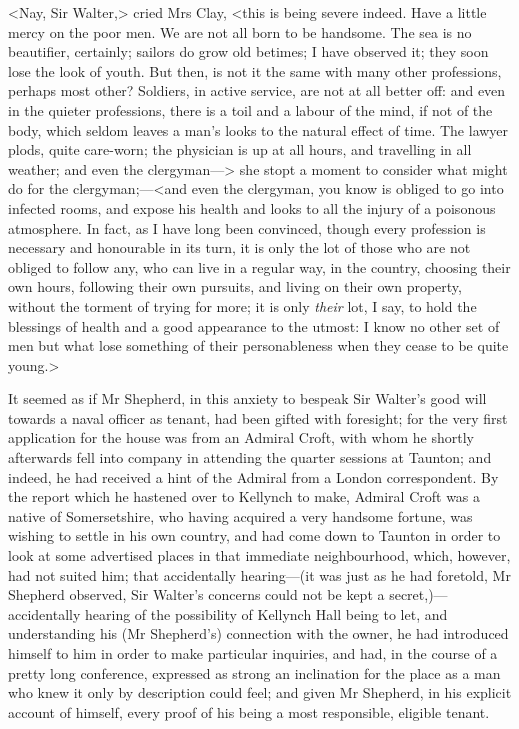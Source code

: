 <Nay, Sir Walter,> cried Mrs Clay, <this is being severe indeed. Have a little mercy on the poor men. We are not all born to be handsome. The sea is no beautifier, certainly; sailors do grow old betimes; I have observed it; they soon lose the look of youth. But then, is not it the same with many other professions, perhaps most other? Soldiers, in active service, are not at all better off: and even in the quieter professions, there is a toil and a labour of the mind, if not of the body, which seldom leaves a man's looks to the natural effect of time. The lawyer plods, quite care-worn; the physician is up at all hours, and travelling in all weather; and even the clergyman—> she stopt a moment to consider what might do for the clergyman;—<and even the clergyman, you know is obliged to go into infected rooms, and expose his health and looks to all the injury of a poisonous atmosphere. In fact, as I have long been convinced, though every profession is necessary and honourable in its turn, it is only the lot of those who are not obliged to follow any, who can live in a regular way, in the country, choosing their own hours, following their own pursuits, and living on their own property, without the torment of trying for more; it is only \textit{their} lot, I say, to hold the blessings of health and a good appearance to the utmost: I know no other set of men but what lose something of their personableness when they cease to be quite young.>

It seemed as if Mr Shepherd, in this anxiety to bespeak Sir Walter's good will towards a naval officer as tenant, had been gifted with foresight; for the very first application for the house was from an Admiral Croft, with whom he shortly afterwards fell into company in attending the quarter sessions at Taunton; and indeed, he had received a hint of the Admiral from a London correspondent. By the report which he hastened over to Kellynch to make, Admiral Croft was a native of Somersetshire, who having acquired a very handsome fortune, was wishing to settle in his own country, and had come down to Taunton in order to look at some advertised places in that immediate neighbourhood, which, however, had not suited him; that accidentally hearing—(it was just as he had foretold, Mr Shepherd observed, Sir Walter's concerns could not be kept a secret,)—accidentally hearing of the possibility of Kellynch Hall being to let, and understanding his (Mr Shepherd's) connection with the owner, he had introduced himself to him in order to make particular inquiries, and had, in the course of a pretty long conference, expressed as strong an inclination for the place as a man who knew it only by description could feel; and given Mr Shepherd, in his explicit account of himself, every proof of his being a most responsible, eligible tenant.

